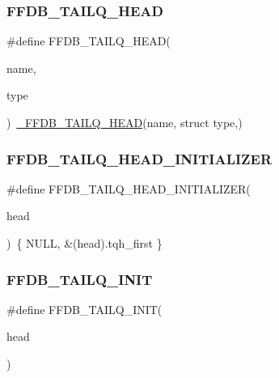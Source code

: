 \subsubsection{\texorpdfstring{FFDB\_TAILQ\_HEAD}{FFDB\_TAILQ\_HEAD}}
{\footnotesize\ttfamily \#define F\+F\+D\+B\+\_\+\+T\+A\+I\+L\+Q\+\_\+\+H\+E\+AD(\begin{DoxyParamCaption}\item[{}]{name,  }\item[{}]{type }\end{DoxyParamCaption})~\mbox{\hyperlink{adat__devel_2other__libs_2filedb_2filehash_2ffdb__cq_8h_ac5fd58bff07d9895d33335221e4100fc}{\+\_\+\+F\+F\+D\+B\+\_\+\+T\+A\+I\+L\+Q\+\_\+\+H\+E\+AD}}(name, struct type,)}

\mbox{\label{adat-devel_2other__libs_2filedb_2filehash_2ffdb__cq_8h_ae73cb59645522f7c14b9d7c837a8689e}} 
\subsubsection{\texorpdfstring{FFDB\_TAILQ\_HEAD\_INITIALIZER}{FFDB\_TAILQ\_HEAD\_INITIALIZER}}
{\footnotesize\ttfamily \#define F\+F\+D\+B\+\_\+\+T\+A\+I\+L\+Q\+\_\+\+H\+E\+A\+D\+\_\+\+I\+N\+I\+T\+I\+A\+L\+I\+Z\+ER(\begin{DoxyParamCaption}\item[{}]{head }\end{DoxyParamCaption})~\{ N\+U\+LL, \&(head).tqh\+\_\+first \}}

\mbox{\label{adat-devel_2other__libs_2filedb_2filehash_2ffdb__cq_8h_a0f800ea48133c64373d3a9415f2da26d}} 
\subsubsection{\texorpdfstring{FFDB\_TAILQ\_INIT}{FFDB\_TAILQ\_INIT}}
{\footnotesize\ttfamily \#define F\+F\+D\+B\+\_\+\+T\+A\+I\+L\+Q\+\_\+\+I\+N\+IT(\begin{DoxyParamCaption}\item[{}]{head }\end{DoxyParamCaption})}

